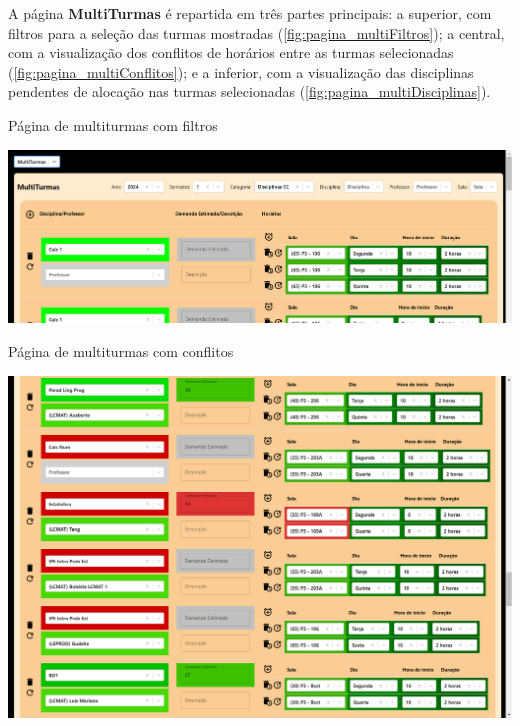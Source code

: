 A página \textbf{MultiTurmas} é repartida em três partes principais: a superior, com filtros para a seleção das turmas mostradas (\autoref{fig:pagina_multiFiltros}); a central, com a visualização dos conflitos de horários entre as turmas selecionadas (\autoref{fig:pagina_multiConflitos}); e a inferior, com a visualização das disciplinas pendentes de alocação nas turmas selecionadas (\autoref{fig:pagina_multiDisciplinas}).

\begin{MyCenteredFigure} \caption{Página de multiturmas com filtros} \label{fig:pagina_multiFiltros}
  \includegraphics[width=\textwidth]{files/img/2.02!7-resultados/2-Multiturmas-Filtros.png}
\end{MyCenteredFigure}

\begin{MyCenteredFigure} \caption{Página de multiturmas com conflitos} \label{fig:pagina_multiConflitos}
  \includegraphics[width=\textwidth]{files/img/2.02!7-resultados/3-Multiturmas-Conflitos.png}
\end{MyCenteredFigure}

